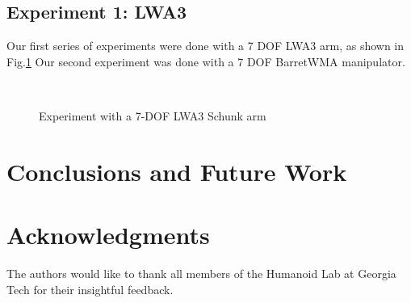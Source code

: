 \documentclass[conference]{IEEEtran}
\begin{document}
\subsection{Experiment 1: LWA3}
Our first series of experiments were done with a 7 DOF LWA3 arm, as shown in Fig.\ref{fig:Experiment1_LWA3} 
Our second experiment was done with a 7 DOF BarretWMA manipulator.
\begin{figure}[]
  \centering
   \\
  \caption{ Experiment with a 7-DOF LWA3 Schunk arm}
  \label{fig:Experiment1_LWA3}
\end{figure}


\section{Conclusions and Future Work}
\label{sec:Conclusions}


\section*{Acknowledgments}
The authors would like to thank all members of the Humanoid Lab
at Georgia Tech for their insightful feedback.



\end{document}
